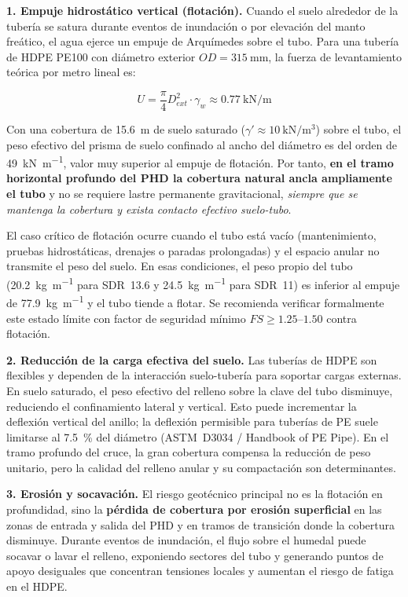 \textbf{1. Empuje hidrostático vertical (flotación).} Cuando el suelo alrededor de la tubería se satura durante eventos de inundación o por elevación del manto freático, el agua ejerce un empuje de Arquímedes sobre el tubo. Para una tubería de HDPE PE100 con diámetro exterior $OD = \SI{315}{\mm}$, la fuerza de levantamiento teórica por metro lineal es:

\begin{equation}
    U = \frac{\pi}{4} D_{ext}^{2} \cdot \gamma_w \approx \SI{0.77}{\kilo\newton\per\meter}
    \label{eq:empuje_vertical}
\end{equation}

Con una cobertura de \SI{15.6}{\meter} de suelo saturado ($\gamma' \approx \SI{10}{\kilo\newton\per\cubic\meter}$) sobre el tubo, el peso efectivo del prisma de suelo confinado al ancho del diámetro es del orden de \SI{49}{\kilo\newton\per\meter}, valor muy superior al empuje de flotación. Por tanto, \textbf{en el tramo horizontal profundo del PHD la cobertura natural ancla ampliamente el tubo} y no se requiere lastre permanente gravitacional, \textit{siempre que se mantenga la cobertura y exista contacto efectivo suelo-tubo}.

El caso crítico de flotación ocurre cuando el tubo está vacío (mantenimiento, pruebas hidrostáticas, drenajes o paradas prolongadas) y el espacio anular no transmite el peso del suelo. En esas condiciones, el peso propio del tubo (\SI{20.2}{\kilogram\per\meter} para SDR~13.6 y \SI{24.5}{\kilogram\per\meter} para SDR~11) es inferior al empuje de \SI{77.9}{\kilogram\per\meter} y el tubo tiende a flotar. Se recomienda verificar formalmente este estado límite con factor de seguridad mínimo \mbox{$FS \geq 1.25$--$1.50$} contra flotación.

\textbf{2. Reducción de la carga efectiva del suelo.} Las tuberías de HDPE son flexibles y dependen de la interacción suelo-tubería para soportar cargas externas. En suelo saturado, el peso efectivo del relleno sobre la clave del tubo disminuye, reduciendo el confinamiento lateral y vertical. Esto puede incrementar la deflexión vertical del anillo; la deflexión permisible para tuberías de PE suele limitarse al \SI{7.5}{\percent} del diámetro (ASTM~D3034 / Handbook of PE Pipe). En el tramo profundo del cruce, la gran cobertura compensa la reducción de peso unitario, pero la calidad del relleno anular y su compactación son determinantes.

\textbf{3. Erosión y socavación.} El riesgo geotécnico principal no es la flotación en profundidad, sino la \textbf{pérdida de cobertura por erosión superficial} en las zonas de entrada y salida del PHD y en tramos de transición donde la cobertura disminuye. Durante eventos de inundación, el flujo sobre el humedal puede socavar o lavar el relleno, exponiendo sectores del tubo y generando puntos de apoyo desiguales que concentran tensiones locales y aumentan el riesgo de fatiga en el HDPE.

